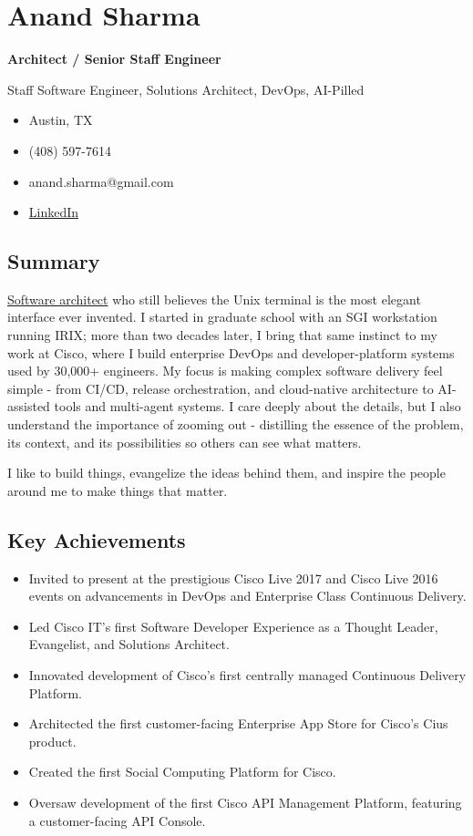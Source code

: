 \documentclass[
]{article}
\author{}
\date{}
\providecommand{\tightlist}{%
  \setlength{\itemsep}{0pt}\setlength{\parskip}{0pt}}
\renewcommand{\tightlist}{%
  \setlength{\itemsep}{0.12em}\setlength{\parskip}{0pt}\setlength{\parsep}{0pt}%
}
\begin{document}
\section{Anand Sharma}\label{anand-sharma}

\textbf{Architect / Senior Staff Engineer}

Staff Software Engineer, Solutions Architect, DevOps, AI-Pilled

\begin{itemize}
\tightlist
\item
  Austin, TX
\item
  (408) 597-7614
\item
  anand.sharma@gmail.com
\item
  \href{https://www.linkedin.com/in/indrayam/}{LinkedIn}
\end{itemize}

\subsection{Summary}\label{summary}

\href{https://resume.indrayam.com/architect.html}{Software architect}
who still believes the Unix terminal is the most elegant interface ever
invented. I started in graduate school with an SGI workstation running
IRIX; more than two decades later, I bring that same instinct to my work
at Cisco, where I build enterprise DevOps and developer-platform systems
used by 30,000+ engineers. My focus is making complex software delivery
feel simple - from CI/CD, release orchestration, and cloud-native
architecture to AI-assisted tools and multi-agent systems. I care deeply
about the details, but I also understand the importance of zooming out -
distilling the essence of the problem, its context, and its
possibilities so others can see what matters.

I like to build things, evangelize the ideas behind them, and inspire
the people around me to make things that matter.

\subsection{Key Achievements}\label{key-achievements}

\begin{itemize}
\tightlist
\item
  Invited to present at the prestigious Cisco Live 2017 and Cisco Live
  2016 events on advancements in DevOps and Enterprise Class Continuous
  Delivery.
\item
  Led Cisco IT's first Software Developer Experience as a Thought
  Leader, Evangelist, and Solutions Architect.
\item
  Innovated development of Cisco's first centrally managed Continuous
  Delivery Platform.
\item
  Architected the first customer-facing Enterprise App Store for Cisco's
  Cius product.
\item
  Created the first Social Computing Platform for Cisco.
\item
  Oversaw development of the first Cisco API Management Platform,
  featuring a customer-facing API Console.
\end{itemize}
\end{document}
